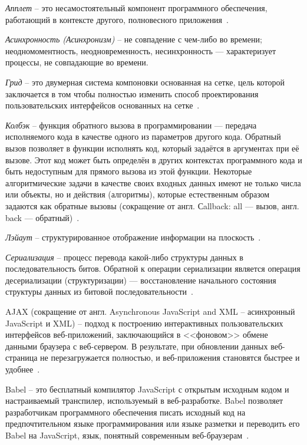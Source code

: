 \label{sec:definitions}

\emph{Апплет} -- это несамостоятельный компонент программного обеспечения, работающий в контексте другого, полновесного приложения~\cite{wiki_applet}.

\emph{Асинхронность (Асинхронизм)} -- не совпадение с чем-либо во времени; неодномоментность, неодновременность, несинхронность — характеризует процессы, не совпадающие во времени.

\emph{Грид} -- это двумерная система компоновки основанная на сетке, цель которой заключается в том чтобы полностью изменить способ проектирования пользовательских интерфейсов основанных на сетке~\cite{grid}.

\emph{Колбэк} -- функция обратного вызова в программировании — передача исполняемого кода в качестве одного из параметров другого кода. Обратный вызов позволяет в функции исполнять код, который задаётся в аргументах при её вызове. Этот код может быть определён в других контекстах программного кода и быть недоступным для прямого вызова из этой функции. Некоторые алгоритмические задачи в качестве своих входных данных имеют не только числа или объекты, но и действия (алгоритмы), которые естественным образом задаются как обратные вызовы (сокращение от англ. Сallback: all — вызов, англ. back — обратный)~\cite{wiki_callback}.

\emph{Лэйаут} -- структурированное отображение информации на плоскость~\cite{wiki_layout}.

\emph{Сериализация} -- процесс перевода какой-либо структуры данных в последовательность битов. Обратной к операции сериализации является операция десериализации (структуризации) — восстановление начального состояния структуры данных из битовой последовательности~\cite{wiki_serialization}.

AJAX (сокращение от англ. Asynchronous JavaScript and XML -- асинхронный JavaScript и XML) -- подход к построению интерактивных пользовательских интерфейсов веб-приложений, заключающийся в <<фоновом>> обмене данными браузера с веб-сервером. В результате, при обновлении данных веб-страница не перезагружается полностью, и веб-приложения становятся быстрее и удобнее~\cite{wiki_ajax}.

Babel -- это бесплатный компилятор JavaScript с открытым исходным кодом и настраиваемый транспилер, используемый в веб-разработке. Babel позволяет разработчикам программного обеспечения писать исходный код на предпочтительном языке программирования или языке разметки и переводить его Babel на JavaScript, язык, понятный современным веб-браузерам~\cite{babel}.

